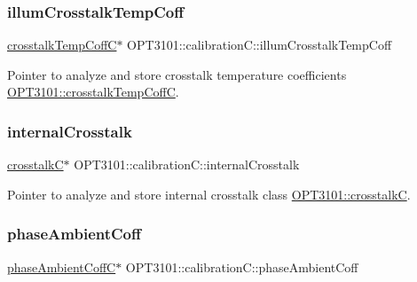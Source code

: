 \mbox{\label{class_o_p_t3101_1_1calibration_c_ac7bcc22317965bb378479fb016c20d3c}} 
\subsubsection{\texorpdfstring{illum\+Crosstalk\+Temp\+Coff}{illumCrosstalkTempCoff}}
{\footnotesize\ttfamily \mbox{\hyperlink{class_o_p_t3101_1_1crosstalk_temp_coff_c}{crosstalk\+Temp\+CoffC}}$\ast$ O\+P\+T3101\+::calibration\+C\+::illum\+Crosstalk\+Temp\+Coff}



Pointer to analyze and store crosstalk temperature coefficients \mbox{\hyperlink{class_o_p_t3101_1_1crosstalk_temp_coff_c}{O\+P\+T3101\+::crosstalk\+Temp\+CoffC}}. 

\mbox{\label{class_o_p_t3101_1_1calibration_c_a4df5b876541e9b33eadf6290fe08b7e5}} 
\subsubsection{\texorpdfstring{internal\+Crosstalk}{internalCrosstalk}}
{\footnotesize\ttfamily \mbox{\hyperlink{class_o_p_t3101_1_1crosstalk_c}{crosstalkC}}$\ast$ O\+P\+T3101\+::calibration\+C\+::internal\+Crosstalk}



Pointer to analyze and store internal crosstalk class \mbox{\hyperlink{class_o_p_t3101_1_1crosstalk_c}{O\+P\+T3101\+::crosstalkC}}. 

\mbox{\label{class_o_p_t3101_1_1calibration_c_ab69d912cc3cad353abeb73d7a95b7428}} 
\subsubsection{\texorpdfstring{phase\+Ambient\+Coff}{phaseAmbientCoff}}
{\footnotesize\ttfamily \mbox{\hyperlink{class_o_p_t3101_1_1phase_ambient_coff_c}{phase\+Ambient\+CoffC}}$\ast$ O\+P\+T3101\+::calibration\+C\+::phase\+Ambient\+Coff}



